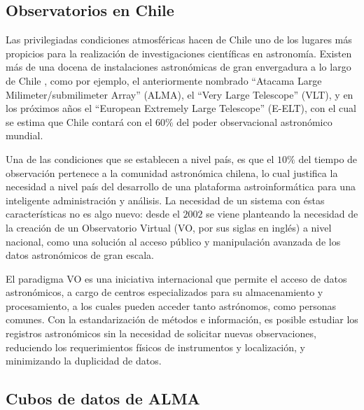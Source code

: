 
\subsection{Observatorios en Chile}

Las privilegiadas condiciones atmosféricas hacen de Chile uno de los lugares
más propicios para la realización de investigaciones científicas en astronomía.
Existen más de una docena de instalaciones astronómicas de gran envergadura a
lo largo de Chile \cite{roadmap}, como por
ejemplo, el anteriormente nombrado ``Atacama Large Milimeter/submilimeter
Array'' (ALMA), el ``Very Large Telescope'' (VLT), y en los próximos años el
``European Extremely Large Telescope'' (E-ELT), con el cual se estima que Chile
contará con el
$60\%$ del poder observacional astronómico mundial.

Una de las condiciones que se establecen a nivel país, es que el $10\%$ del
tiempo de observación pertenece a la comunidad astronómica chilena, lo cual
justifica la necesidad a nivel país del desarrollo de una plataforma
astroinformática para una inteligente administración y análisis.
La necesidad de un sistema con éstas características no es algo nuevo:
desde el $2002$ se viene planteando la necesidad de la
creación de un Observatorio Virtual (VO, por sus siglas en inglés) a nivel
nacional, como una solución al acceso público y manipulación avanzada de los 
datos astronómicos de gran escala.

El paradigma VO es una iniciativa internacional que permite el acceso de datos
astronómicos, a cargo de centros especializados para su almacenamiento y
procesamiento, a los cuales pueden acceder tanto astrónomos, como personas
comunes. Con la estandarización de métodos e información, es posible estudiar
los registros astronómicos sin la necesidad de solicitar nuevas observaciones,
reduciendo los requerimientos físicos de instrumentos y localización, y
minimizando la duplicidad de datos.

\subsection{Cubos de datos de ALMA}

